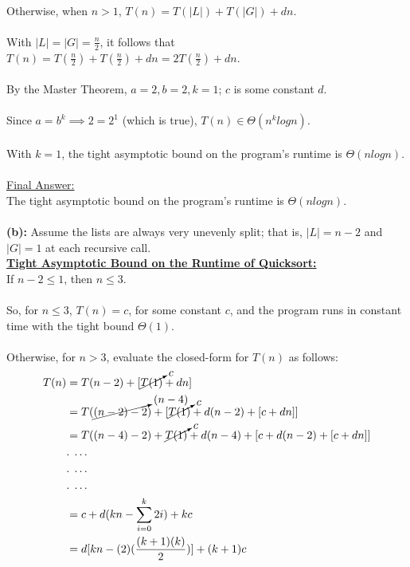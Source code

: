 \documentclass[12pt]{article}
\begin{document}
\\
Otherwise, when $n > 1$, $T(n) = T(|L|) + T(|G|) + dn$. \\
\\
With $|L| = |G| = \frac{n}{2}$, it follows that $T(n) = T(\frac{n}{2}) + T(\frac{n}{2}) + dn = 2T(\frac{n}{2}) + dn$. \\
\\
By the Master Theorem, $a = 2, b = 2, k = 1$; $c$ is some constant $d$. \\
\\
Since $a = b^k \implies 2 = 2^1$ (which is true), $T(n) \in \Theta (n^k logn)$. \\
\\
With $k = 1$, the tight asymptotic bound on the program's runtime is $\Theta (n logn)$. \\
\\
\underline{Final Answer:} \\
The tight asymptotic bound on the program's runtime is $\Theta (n logn)$. \\
\\
\textbf{(b):} Assume the lists are always very unevenly split; that is, \(|L| = n - 2\) and \(|G| = 1\) at each recursive call. \\
\textbf{\underline{Tight Asymptotic Bound on the Runtime of Quicksort:}} \\
If $n - 2 \leq 1$, then $n \leq 3$. \\
\\
So, for $n \leq 3$, $T(n) = c$, for some constant $c$, and the program runs in constant time with the tight bound $\Theta (1)$. \\
\\
Otherwise, for $n > 3$, evaluate the closed-form for $T(n)$ as follows:
\begin{equation*}
    \begin{aligned}
        T(n) &= T(n - 2) + [\cancelto{c}{T(1)} + dn] \\
        &= T(\cancelto{(n - 4)}{(n - 2) - 2}) + [\cancelto{c}{T(1)} + d(n - 2) + [c + dn]] \\
        &= T((n - 4) - 2) + \cancelto{c}{T(1)} + d(n - 4) + [c + d(n - 2) + [c + dn]] \\
        &. \; \dots \\
        &. \; \dots \\
        &. \; \dots \\
        &= c + d(kn - \sum_{i = 0}^{k} 2i) + kc \\
        &= d[kn - (2)(\frac{(k + 1)(k)}{2})] + (k + 1)c
    \end{aligned}
\end{equation*}
\end{document}
